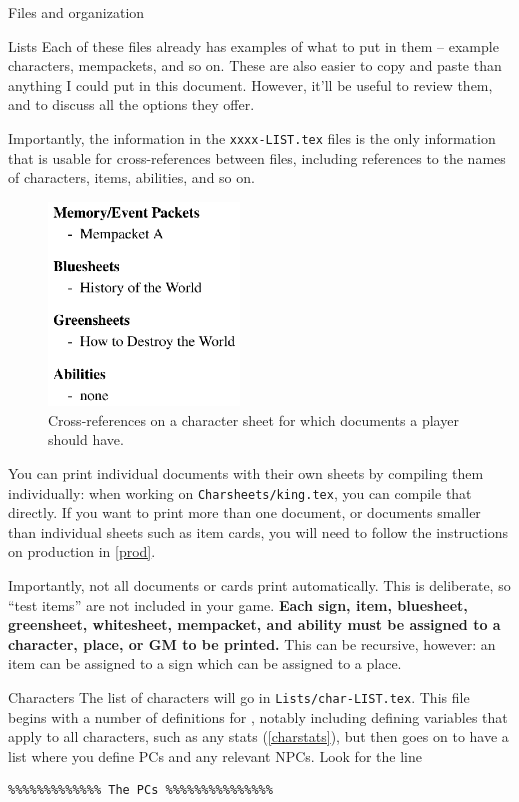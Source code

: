 \documentclass[sheet]{GameTexBase}
\begin{document}
\begin{section}{Files and organization}
\begin{subsection}{Lists}
Each of these files already has examples of what to put in them -- example characters, mempackets, and so on.  These are also easier to copy and paste than anything I could put in this document.
However, it'll be useful to review them, and to discuss all the options they offer.

Importantly, the information in the \lstinline{xxxx-LIST.tex} files is the only information that is usable for cross-references between files, including references to the names of characters, items, abilities, and so on.

\begin{figure}
\centering
\includegraphics[width=2in]{charsheet-crossref}
\caption{Cross-references on a character sheet for which documents a player should have.}
\end{figure}

You can print individual documents with their own sheets by compiling them individually: when working on \lstinline|Charsheets/king.tex|, you can compile that directly.  If you want to print more than one document, or documents smaller than individual sheets such as item cards, you will need to follow the instructions on production in \ref{prod}.

Importantly, not all documents or cards print automatically.  This is deliberate, so ``test items'' are not included in your game.  \textbf{Each sign, item, bluesheet, greensheet, whitesheet, mempacket, and ability must be assigned to a character, place, or GM to be printed.}
This can be recursive, however: an item can be assigned to a sign which can be assigned to a place.  
\end{subsection}
\begin{subsection}{Characters}
\label{charlist}
The list of characters will go in \lstinline|Lists/char-LIST.tex|.  This file begins with a number of definitions for \gametex{}, notably including defining variables that apply to all characters, such as any stats (\ref{charstats}),
but then goes on to have a list where you define PCs and any relevant NPCs.  Look for the line
\begin{verbatim}
%%%%%%%%%%%%% The PCs %%%%%%%%%%%%%%%
\end{verbatim}


\end{subsection}
\end{section}
\end{document}

